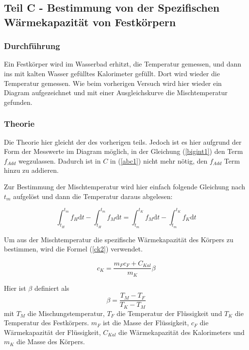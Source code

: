 \documentclass[11pt,a4paper]{article}
\begin{document}
\subsection{Teil C - Bestimmung von der Spezifischen W\"armekapazit\"at von Festk\"orpern}

\subsubsection{Durchf\"uhrung}

Ein Festk\"orper wird im Wasserbad erhitzt, die Temperatur gemessen, und dann ins mit kalten Wasser gef\"ulltes Kalorimeter gef\"ullt. Dort wird wieder die Temperatur gemessen. Wie beim vorherigen Versuch wird hier wieder ein Diagram aufgezeichnet und mit einer Ausgleichskurve die Mischtemperatur gefunden. 

\subsubsection{Theorie}

Die Theorie hier gleicht der des vorherigen teils. Jedoch ist es hier aufgrund der Form der Messwerte im Diagram m\"oglich, in der Gleichung (\ref{bigint1}) den Term $f_{Add}$ wegzulassen. Dadurch ist in $C$ in (\ref{abc1}) nicht mehr n\"otig, den $f_{Add}$ Term hinzu zu addieren.

Zur Bestimmung der Mischtemperatur wird hier einfach folgende Gleichung nach $t_m$ aufgel\"ost und dann die Temperatur daraus abgelesen:

\begin{equation}
\int_{t_H}^{t_m}f_H\mathrm{d}t-\int_{t_H}^{t_m}f_M\mathrm{d}t=\int_{t_m}^{t_K}f_M\mathrm{d}t-\int_{t_m}^{t_K}f_K\mathrm{d}t\label{bigint2}
\end{equation}

Um aus der Mischtemperatur die spezifische W\"armekapazit\"at des K\"orpers zu bestimmen, wird die Formel (\ref{ck2}) verwendet.

\begin{equation}
c_K=\frac{m_Fc_F+C_{Kal}}{m_K}\beta\label{ck2}
\end{equation}

Hier ist $\beta$ definiert als
\[
\beta=\frac{T_M-T_F}{T_K-T_M}
\]
mit $T_M$ die Mischungstemperatur, $T_F$ die Temperatur der Fl\"ussigkeit und $T_K$ die Temperatur des Festk\"orpers. $m_F$ ist die Masse der Fl\"ussigkeit, $c_F$ die W\"armekapazit\"at der Fl\"ussigkeit, $C_{Kal}$ die W\"armekapazit\"at des Kalorimeters und $m_K$ die Masse des K\"orpers.
\end{document}
